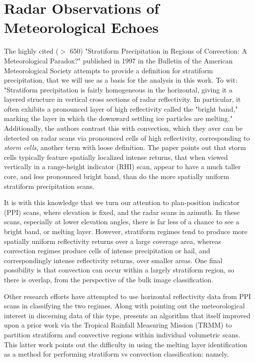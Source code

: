 \section{Radar Observations of Meteorological Echoes}
\label{sec:meteorology_echoes}


The highly cited ($>$ 650) "Stratiform Precipitation in Regions of Convection: A Meteorological Paradox?"\cite{houze1997stratiform} published in 1997 in the Bulletin of the American Meteorological Society attempts to provide a definition for stratiform precipitation, that we will use as a basis for the analysis in this work.
To wit: 
"Stratiform precipitation is fairly homogeneous in the horizontal, giving it a layered structure in vertical cross sections of radar reflectivity. In particular, it often exhibits a pronounced layer of high reflectivity called the "bright band," marking the layer in which the downward settling ice particles are melting."
Additionally, the authors contrast this with convection, which they aver can be detected on radar scans via pronounced cells of high reflectivity, corresponding to \textit{storm cells}, another term with loose definition.
The paper points out that storm cells typically feature spatially localized intense returns, that when viewed vertically in a range-height indicator (RHI) scan, appear to have a much taller core, and less pronounced bright band, than do the more spatially uniform stratiform precipitation scans.

It is with this knowledge that we turn our attention to plan-position indicator (PPI) scans, where elevation is fixed, and the radar scans in azimuth. 
In these scans, especially at lower elevation angles, there is far less of a chance to see a bright band, or melting layer.
However, stratiform regimes tend to produce more spatially uniform reflectivity returns over a large coverage area, whereas convection regimes produce cells of intense precipitation or hail, and correspondingly intense reflectivity returns, over smaller areas.
One final possibility is that convection can occur within a largely stratiform region, so there is overlap, from the perspective of the bulk image classification.

Other research efforts have attempted to use horizontal reflectivity data from PPI scans in classifying the two regimes. 
Along with pointing out the meteorological interest in discerning data of this type, \cite{biggerstaff2000improved} presents an algorithm that itself improved upon a prior work \cite{steiner1995climatological} via the Tropical Rainfall Measuring Mission (TRMM) to partition stratiform and convective regions within individual volumetric scans. 
This latter work points out the difficulty in using the melting layer identification as a method for performing stratiform vs convection classification: namely,

